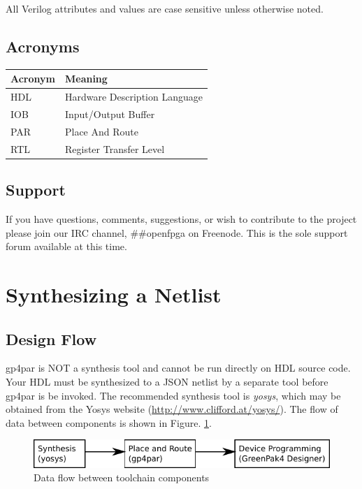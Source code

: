 \documentclass[11pt]{article}
\begin{document}
All Verilog attributes and values are case sensitive unless otherwise noted.

\subsection{Acronyms}

\begin{tabularx}{4in}{|l|X|}
\hline
{\bfseries Acronym} & {\bfseries Meaning} \\
\hline
HDL & Hardware Description Language \\
\hline
IOB & Input/Output Buffer \\
\hline
PAR & Place And Route \\
\hline
RTL & Register Transfer Level \\
\hline
\end{tabularx}

\subsection{Support}

If you have questions, comments, suggestions, or wish to contribute to the project please join our IRC channel,
\#\#openfpga on Freenode. This is the sole support forum available at this time.

\pagebreak
\section{Synthesizing a Netlist}

\subsection{Design Flow}

gp4par is NOT a synthesis tool and cannot be run directly on HDL source code. Your HDL must be synthesized to
a JSON netlist by a separate tool before gp4par is be invoked. The recommended synthesis tool is 
\emph{yosys}, which may be obtained from the Yosys website (\url{http://www.clifford.at/yosys/}). The flow of data 
between components is shown in Figure. \ref{flow}.

\begin{figure}[h]
\centering
\includegraphics[scale=1]{figures/flow.pdf}
\caption{Data flow between toolchain components}
\label{flow}
\end{figure}
\end{document}
